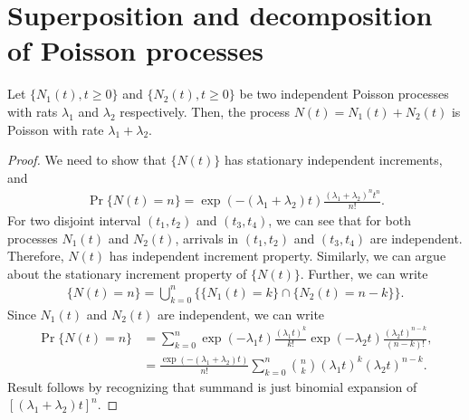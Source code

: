 \documentclass[a4paper,10pt,english]{article}
\begin{document}
\section{Superposition and decomposition of Poisson processes}
\begin{thm} Let $\{N_1(t), t \geqslant  0\}$ and $\{N_2(t), t \geqslant  0\}$ be two independent Poisson processes with rats $\lambda_{1}$ and $\lambda_{2}$ respectively. Then, the process $N(t)= N_{1}(t) +N_{2}(t)$ is Poisson with rate $\lambda_{1}+\lambda_{2}$.
\end{thm}
\begin{proof} We need to show that $\{N(t)\}$ has stationary independent increments, and 
\begin{align*}
	\Pr\{N(t)=n\}=   \exp(-(\lambda_{1}+\lambda_{2})t)\frac{(\lambda_{1}+\lambda_{2})^n t^n}{n!}.
\end{align*}
For two disjoint interval $(t_{1}, t_{2})$ and $(t_3,t_4)$, we can see that for both processes $N_{1}(t)$ and $N_2(t)$,  arrivals in $(t_{1}, t_{2})$ and $(t_3,t_{4})$ are independent. Therefore, $N(t)$ has independent increment property. Similarly, we can argue about the stationary increment property of $\{N(t)\}$. Further, we can write 
\begin{align*}
	\{N(t)=n\} = \bigcup_{k=0}^n\{\{N_1(t) = k\}\cap\{N_2(t) = n-k\}\}.
\end{align*}
Since $N_1(t)$ and $N_2(t)$ are independent, we can write
\begin{align*}
	\Pr\{N(t)=n\} &= \sum_{k=0}^n\exp(-\lambda_1t)\frac{(\lambda_1t)^k}{k!}\exp(-\lambda_2t)\frac{(\lambda_2t)^{n-k}}{(n-k)!},\\
	&= \frac{\exp(-(\lambda_1+\lambda_2)t)}{n!}\sum_{k=0}^n\binom{n}{k}(\lambda_1t)^k(\lambda_2t)^{n-k}.%
\end{align*}
Result follows by recognizing that summand is just binomial expansion of $[(\lambda_1 + \lambda_2)t]^n$.
\end{proof}
\end{document}
